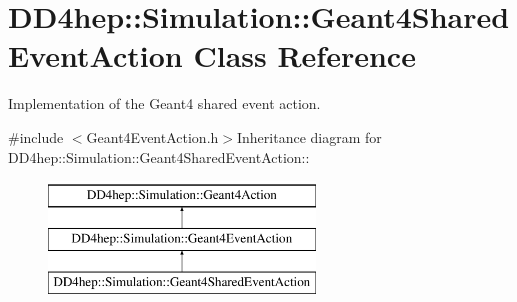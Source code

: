 \hypertarget{class_d_d4hep_1_1_simulation_1_1_geant4_shared_event_action}{
\section{DD4hep::Simulation::Geant4SharedEventAction Class Reference}
\label{class_d_d4hep_1_1_simulation_1_1_geant4_shared_event_action}
}


Implementation of the Geant4 shared event action.  


{\ttfamily \#include $<$Geant4EventAction.h$>$}Inheritance diagram for DD4hep::Simulation::Geant4SharedEventAction::\begin{figure}[H]
\begin{center}
\leavevmode
\includegraphics[height=3cm]{class_d_d4hep_1_1_simulation_1_1_geant4_shared_event_action}
\end{center}
\end{figure}
